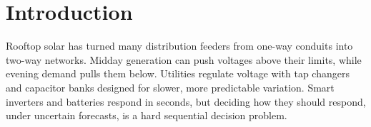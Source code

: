 \chapter{Introduction}
\label{ch:introduction}

Rooftop solar has turned many distribution feeders from one-way conduits into two-way networks.
Midday generation can push voltages above their limits, while evening demand pulls them below.
Utilities regulate voltage with tap changers and capacitor banks designed for slower, more
predictable variation. Smart inverters and batteries respond in seconds, but deciding how they
should respond, under uncertain forecasts, is a hard sequential decision problem.
